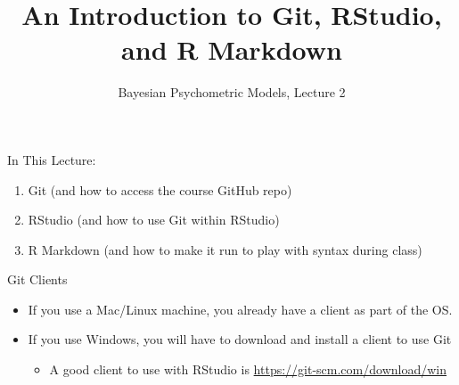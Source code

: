 \documentclass[ignorenonframetext,]{beamer}
\title{An Introduction to Git, RStudio, and R Markdown}
\author{Bayesian Psychometric Models, Lecture 2}
\date{}
\providecommand{\tightlist}{%
  \setlength{\itemsep}{0pt}\setlength{\parskip}{0pt}}
\begin{document}
\frame{\titlepage}

\begin{frame}

\end{frame}

\begin{frame}{In This Lecture:}

\begin{enumerate}
\def\labelenumi{\arabic{enumi}.}
\tightlist
\item
  Git (and how to access the course GitHub repo)
\item
  RStudio (and how to use Git within RStudio)
\item
  R Markdown (and how to make it run to play with syntax during class)
\end{enumerate}

\end{frame}

\begin{frame}{Git Clients}

\begin{itemize}
\tightlist
\item
  If you use a Mac/Linux machine, you already have a client as part of
  the OS.
\item
  If you use Windows, you will have to download and install a client to
  use Git

  \begin{itemize}
  \tightlist
  \item
    A good client to use with RStudio is
    \url{https://git-scm.com/download/win}
  \end{itemize}
\end{itemize}

\end{frame}
\end{document}
